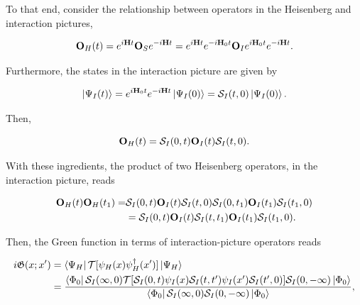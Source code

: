 To that end, consider the relationship between operators in the Heisenberg and interaction pictures,

\begin{equation}
    {\bf O}_{H}(t) = e^{i {\bf H} t} {\bf O}_{S} e^{-i {\bf H} t} = e^{i {\bf H} t} e^{-i {\bf H}_0 t} {\bf O}_{I} e^{i {\bf H}_0 t} e^{-i {\bf H} t}.
\end{equation}

Furthermore, the states in the interaction picture are given by 

\begin{equation}
    \ket{\Psi_I(t)} = e^{i{\bf H}_0 t} e^{-i {\bf H}t} \ket{\Psi_I(0)} = \mathcal{S}_{I}(t,0) \ket{\Psi_I(0)}.
\end{equation}

Then, 

\begin{equation}
    {\bf O}_{H}(t) = \mathcal{S}_{I}(0,t) {\bf O}_{I}(t) \mathcal{S}_{I}(t,0). 
\end{equation}

With these ingredients, the product of two Heisenberg operators, in the interaction picture, reads

\begin{equation}
    \begin{split}
        {\bf O}_{H}(t) {\bf O}_{H}(t_1) =& \mathcal{S}_{I}(0,t) {\bf O}_{I}(t) \mathcal{S}_{I}(t,0)  \mathcal{S}_{I}(0,t_1) {\bf O}_{I}(t_1) \mathcal{S}_{I}(t_1,0) \\
        &= \mathcal{S}_{I}(0,t) {\bf O}_{I}(t) \mathcal{S}_{I}(t,t_1) {\bf O}_{I}(t_1) \mathcal{S}_{I}(t_1,0).
    \end{split}
\end{equation}

Then, the Green function in terms of interaction-picture operators reads

\begin{equation}
\begin{split}
    i \mathfrak{G}(x; x') &= \bra{\Psi_H} \mathcal{T} [\psi_{H}(x) \psi^\dagger_{H}(x')] \ket{\Psi_H} \\
    &= \frac{\bra{\Phi_0} \mathcal{S}_I(\infty, 0) \mathcal{T} [\mathcal{S}_I(0, t) \psi_{I}(x) \mathcal{S}_I(t, t') \psi_{I}(x') \mathcal{S}_I(t', 0) ] \mathcal{S}_I(0, -\infty)\ket{\Phi_0}}{\bra{\Phi_0} \mathcal{S}_I(\infty, 0)\mathcal{S}_I(0, -\infty)\ket{\Phi_0}},
\end{split}
\end{equation}

